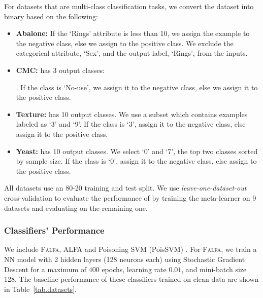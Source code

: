 \documentclass[runningheads]{llncs}
\newcommand{\falfa}{\textsc{Falfa}\xspace}
\begin{document}
For datasets that are multi-class classification tasks, we convert the dataset into binary based on the following:
\begin{itemize}
    \item \textbf{Abalone:} If the `Rings' attribute is less than 10, we assign the example to the negative class,  else we assign to the positive class. We exclude the categorical attribute, `Sex', and the output label, `Rings', from the inputs.

    \item \textbf{CMC:} has 3 output classes:
          .
          If the class is `No-use', we assign it to the negative class, else we assign it to the positive class.

    \item \textbf{Texture:} has 10 output classes. We use a subset which contains examples labeled as `3' and `9'.
          If the class is `3', assign it to the negative class, else assign it to the positive class.

    \item \textbf{Yeast:} has 10 output classes. We select `0' and `7', the top two classes sorted by sample size.
          If the class is `0', assign it to the negative class, else assign to the positive class.
\end{itemize}
All datasets use an 80-20 training and test split.
We use {\em leave-one-dataset-out} cross-validation to evaluate the performance of \diva by training the meta-learner on 9 datasets and evaluating on the remaining one.

\subsubsection{Classifiers' Performance}

We include \falfa, ALFA \cite{xiao2012adversarial} and Poisoning SVM (PoisSVM) \cite{biggio2012poisoning}.
For \falfa, we train a NN model with 2 hidden layers (128 neurons each) using Stochastic Gradient Descent for a maximum of 400 epochs, learning rate $0.01$, and mini-batch size 128.
The baseline performance of these classifiers trained on clean data are shown in Table~\ref{tab.datasets}.
\end{document}
